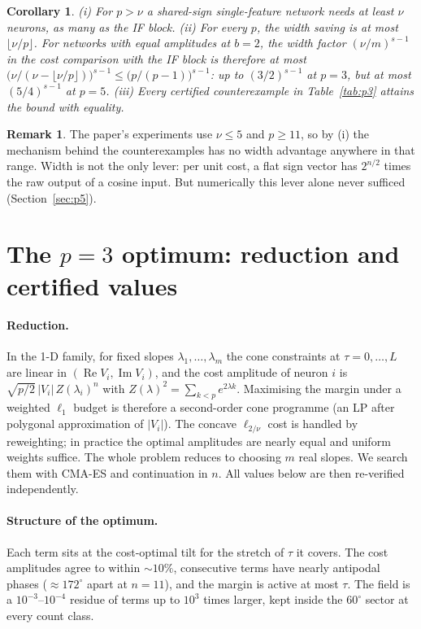 \documentclass[11pt]{article}
\newtheorem{corollary}[theorem]{Corollary}
\theoremstyle{definition}
\newtheorem{remark}[theorem]{Remark}
\renewcommand{\Re}{\operatorname{Re}}
\renewcommand{\Im}{\operatorname{Im}}
\begin{document}
\begin{corollary}\label{cor:width}
(i) For $p>\nu$ a shared-sign single-feature network needs at least $\nu$ neurons, as many as the IF block.
(ii) For every $p$, the width saving is at most $\lfloor\nu/p\rfloor$.  For networks with equal amplitudes at $b=2$, the
width factor $(\nu/m)^{s-1}$ in the cost comparison with the IF block is therefore at most
$\big(\nu/(\nu-\lfloor\nu/p\rfloor)\big)^{s-1}\le\big(p/(p-1)\big)^{s-1}$: up to $(3/2)^{s-1}$ at $p=3$, but at most
$(5/4)^{s-1}$ at $p=5$.
(iii) Every certified counterexample in Table~\ref{tab:p3} attains the bound with equality.
\end{corollary}

\begin{remark}
The paper's experiments use $\nu\le5$ and $p\ge11$, so by (i) the mechanism behind the counterexamples has no width
advantage anywhere in that range.  Width is not the only lever: per unit cost, a flat sign vector has $2^{n/2}$ times
the raw output of a cosine input.  But numerically this lever alone never sufficed (Section~\ref{sec:p5}).
\end{remark}

\section{The $p=3$ optimum: reduction and certified values}
\paragraph{Reduction.}  In the 1-D family, for fixed slopes $\lambda_1,\dots,\lambda_m$ the cone constraints at
$\tau=0,\dots,L$ are linear in $(\Re V_i,\Im V_i)$, and the cost amplitude of neuron $i$ is
$\sqrt{p/2}\,|V_i|\,Z(\lambda_i)^n$ with $Z(\lambda)^2=\sum_{k<p}e^{2\lambda k}$.  Maximising the margin under a weighted
$\ell_1$ budget is therefore a second-order cone programme (an LP after polygonal approximation of $|V_i|$).  The concave
$\ell_{2/\nu}$ cost is handled by reweighting; in practice the optimal amplitudes are nearly equal and uniform weights
suffice.  The whole problem reduces to choosing $m$ real slopes.  We search them with CMA-ES and continuation in $n$.
All values below are then re-verified independently.

\paragraph{Structure of the optimum.}  Each term sits at the cost-optimal tilt for the stretch of $\tau$ it covers.  The
cost amplitudes agree to within $\sim10\%$, consecutive terms have nearly antipodal phases ($\approx172^\circ$ apart at
$n=11$), and the margin is active at most $\tau$.  The field is a $10^{-3}$--$10^{-4}$ residue of terms up to $10^3$ times
larger, kept inside the $60^\circ$ sector at every count class.
\end{document}
